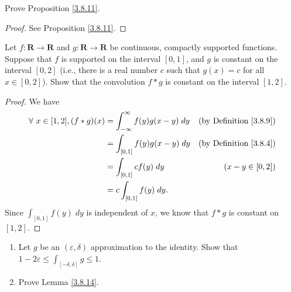 \begin{exercise}\label{ex 3.8.4}
    Prove Proposition \ref{3.8.11}.
\end{exercise}

\begin{proof}
    See Proposition \ref{3.8.11}.
\end{proof}

\begin{exercise}\label{ex 3.8.5}
    Let \(f : \mathbf{R} \to \mathbf{R}\) and \(g : \mathbf{R} \to \mathbf{R}\) be continuous, compactly supported functions.
    Suppose that \(f\) is supported on the interval \([0, 1]\), and \(g\) is constant on the interval \([0, 2]\)
    (i.e., there is a real number \(c\) such that \(g(x) = c\) for all \(x \in [0, 2]\)).
    Show that the convolution \(f * g\) is constant on the interval \([1, 2]\).
\end{exercise}

\begin{proof}
    We have
    \begin{align*}
        \forall\ x \in [1, 2], (f * g)(x) & = \int_{-\infty}^\infty f(y) g(x - y) \; dy & \text{(by Definition \ref{3.8.9})} \\
                                          & = \int_{[0, 1]} f(y) g(x - y) \; dy         & \text{(by Definition \ref{3.8.4})} \\
                                          & = \int_{[0, 1]} c f(y) \; dy                & (x - y \in [0, 2])                 \\
                                          & = c \int_{[0, 1]} f(y) \; dy.
    \end{align*}
    Since \(\int_{[0, 1]} f(y) \; dy\) is independent of \(x\), we know that \(f * g\) is constant on \([1, 2]\).
\end{proof}

\begin{exercise}\label{ex 3.8.6}
    \quad
    \begin{enumerate}
        \item Let \(g\) be an \((\varepsilon, \delta)\) approximation to the identity.
              Show that \(1 - 2 \varepsilon \leq \int_{[-\delta, \delta]} g \leq 1\).
        \item Prove Lemma \ref{3.8.14}.
    \end{enumerate}
\end{exercise}

